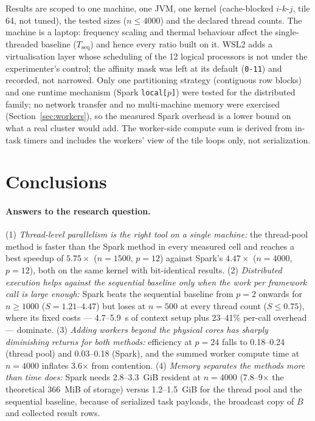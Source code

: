 \documentclass[11pt,a4paper]{article}
\begin{document}
Results are scoped to one machine, one JVM, one kernel (cache-blocked
$i$-$k$-$j$, tile 64, not tuned), the tested sizes ($n \le 4000$) and the
declared thread counts. The machine is a laptop: frequency scaling and
thermal behaviour affect the single-threaded baseline
($T_{\mathrm{seq}}$) and hence every ratio built on it. WSL2 adds a
virtualisation layer whose scheduling of the 12 logical processors is not
under the experimenter's control; the affinity mask was left at its default
(\texttt{0-11}) and recorded, not narrowed. Only one partitioning strategy
(contiguous row blocks) and one runtime mechanism (Spark
\texttt{local[$p$]}) were tested for the distributed family; no network
transfer and no multi-machine memory were exercised
(Section~\ref{sec:workers}), so the measured Spark overhead is a lower
bound on what a real cluster would add. The worker-side compute sum is
derived from in-task timers and includes the workers' view of the tile
loops only, not serialization.

\section{Conclusions}
\label{sec:conclusions}

\paragraph{Answers to the research question.}
(1) \emph{Thread-level parallelism is the right tool on a single machine:}
the thread-pool method is faster than the Spark method in every measured
cell and reaches a best speedup of $5.75\times$ ($n = 1500$, $p = 12$)
against Spark's $4.47\times$ ($n = 4000$, $p = 12$), both on the same
kernel with bit-identical results. (2) \emph{Distributed execution helps
against the sequential baseline only when the work per framework call is
large enough:} Spark beats the sequential baseline from $p = 2$ onwards
for $n \ge 1000$ ($S = 1.21$--$4.47$) but loses at $n = 500$ at every
thread count ($S \le 0.75$), where its fixed costs --- 4.7--5.9~s of
context setup plus 23--41\% per-call overhead --- dominate. (3)
\emph{Adding workers beyond the physical cores has sharply diminishing
returns for both methods:} efficiency at $p = 24$ falls to 0.18--0.24
(thread pool) and 0.03--0.18 (Spark), and the summed worker compute time
at $n = 4000$ inflates 3.6$\times$ from contention. (4) \emph{Memory
separates the methods more than time does:} Spark needs 2.8--3.3~GiB
resident at $n = 4000$ (7.8--9$\times$ the theoretical 366~MiB of
storage) versus 1.2--1.5~GiB for the thread pool and the sequential
baseline, because of serialized task payloads, the broadcast copy of $B$
and collected result rows.
\end{document}
